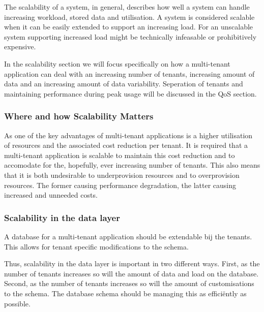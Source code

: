 The scalability of a system, in general, describes how well a system can handle increasing workload, stored data and utilisation. 
A system is considered scalable when it can be easily extended to support an increasing load. 
For an unscalable system supporting increased load might be technically infeasable or prohibitively expensive.\cite{bondi2000scalability}

In the scalability section we will focus specifically on how a multi-tenant application can deal with an increasing number of tenants, increasing amount of data and an increasing amount of data variability. 
Seperation of tenants and maintaining performance during peak usage will be discussed in the QoS section.

\subsubsection{Where and how Scalability Matters}
As one of the key advantages of multi-tenant applications is a higher utilisation of resources and the associated cost reduction per tenant.\cite{bezemer2010multi} 
It is required that a multi-tenant application is scalable to maintain this cost reduction and to accomodate for the, hopefully, ever increasing number of tenants.
This also means that it is both undesirable to underprovision resources and to overprovision resources. The former causing performance degradation, the latter causing increased and unneeded costs.


\subsubsection{Scalability in the data layer}
A database for a multi-tenant application should be extendable bij the tenants.
This allows for tenant specific modifications to the schema.

Thus, scalability in the data layer is important in two different ways.
First, as the number of tenants increases so will the amount of data and load on the database.
Second, as the number of tenants increases so will the amount of customisations to the schema. 
The database schema should be managing this as effici\"ently as possible.

